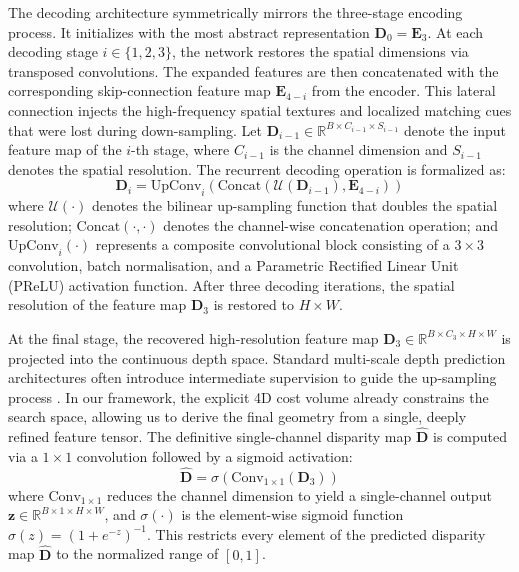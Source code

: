 \documentclass[lettersize,journal]{IEEEtran}
\begin{document}
The decoding architecture symmetrically mirrors the three-stage encoding process. It initializes with the most abstract representation $\mathbf{D}_0 = \mathbf{E}_3$. At each decoding stage $i \in \{1, 2, 3\}$, the network restores the spatial dimensions via transposed convolutions. The expanded features are then concatenated with the corresponding skip-connection feature map $\mathbf{E}_{4-i}$ from the encoder. This lateral connection injects the high-frequency spatial textures and localized matching cues that were lost during down-sampling. Let $\mathbf{D}_{i-1} \in \mathbb{R}^{B \times C_{i-1} \times S_{i-1}}$ denote the input feature map of the $i$-th stage, where $C_{i-1}$ is the channel dimension and $S_{i-1}$ denotes the spatial resolution. The recurrent decoding operation is formalized as:
\begin{equation}
\mathbf{D}_i = \text{UpConv}_i \left( \text{Concat} \left( \mathcal{U}(\mathbf{D}_{i-1}), \mathbf{E}_{4-i} \right) \right)
\end{equation}
where $\mathcal{U}(\cdot)$ denotes the bilinear up-sampling function that doubles the spatial resolution; $\text{Concat}(\cdot, \cdot)$ denotes the channel-wise concatenation operation; and $\text{UpConv}_i(\cdot)$ represents a composite convolutional block consisting of a $3 \times 3$ convolution, batch normalisation, and a Parametric Rectified Linear Unit (PReLU) activation function. After three decoding iterations, the spatial resolution of the feature map $\mathbf{D}_3$ is restored to $H \times W$.

At the final stage, the recovered high-resolution feature map $\mathbf{D}_3 \in \mathbb{R}^{B \times C_3 \times H \times W}$ is projected into the continuous depth space. Standard multi-scale depth prediction architectures often introduce intermediate supervision to guide the up-sampling process \cite{eigen2014}. In our framework, the explicit 4D cost volume already constrains the search space, allowing us to derive the final geometry from a single, deeply refined feature tensor. The definitive single-channel disparity map $\hat{\mathbf{D}}$ is computed via a $1 \times 1$ convolution followed by a sigmoid activation:
\begin{equation}
\hat{\mathbf{D}} = \sigma \left( \text{Conv}_{1 \times 1}(\mathbf{D}_3) \right)
\end{equation}
where $\text{Conv}_{1 \times 1}$ reduces the channel dimension to yield a single-channel output $\mathbf{z} \in \mathbb{R}^{B \times 1 \times H \times W}$, and $\sigma(\cdot)$ is the element-wise sigmoid function $\sigma(z) = (1 + e^{-z})^{-1}$. This restricts every element of the predicted disparity map $\hat{\mathbf{D}}$ to the normalized range of $[0, 1]$. 
\end{document}
